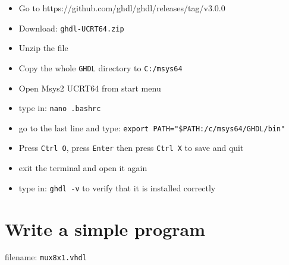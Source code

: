\documentclass[11pt]{article}
\providecommand{\tightlist}{%
      \setlength{\itemsep}{0pt}\setlength{\parskip}{0pt}}
\begin{document}
\begin{itemize}
\tightlist
\item
  Go to https://github.com/ghdl/ghdl/releases/tag/v3.0.0
\item
  Download: \texttt{ghdl-UCRT64.zip}
\item
  Unzip the file
\item
  Copy the whole \texttt{GHDL} directory to \texttt{C:/msys64}
\item
  Open Msys2 UCRT64 from start menu
\item
  type in: \texttt{nano\ .bashrc}
\item
  go to the last line and type:
  \texttt{export\ PATH="\$PATH:/c/msys64/GHDL/bin"}
\item
  Press \texttt{Ctrl\ O}, press \texttt{Enter} then press
  \texttt{Ctrl\ X} to save and quit
\item
  exit the terminal and open it again
\item
  type in: \texttt{ghdl\ -v} to verify that it is installed correctly
\end{itemize}

    \hypertarget{write-a-simple-program}{%
\section{Write a simple program}\label{write-a-simple-program}}

filename: \texttt{mux8x1.vhdl}
\end{document}
